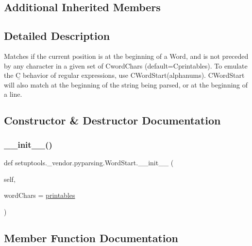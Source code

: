 \subsection*{Additional Inherited Members}


\subsection{Detailed Description}
\begin{DoxyVerb}Matches if the current position is at the beginning of a Word, and
is not preceded by any character in a given set of C{wordChars}
(default=C{printables}). To emulate the C{\b} behavior of regular expressions,
use C{WordStart(alphanums)}. C{WordStart} will also match at the beginning of
the string being parsed, or at the beginning of a line.
\end{DoxyVerb}
 

\subsection{Constructor \& Destructor Documentation}
\mbox{\label{classsetuptools_1_1__vendor_1_1pyparsing_1_1WordStart_a0a024c22e76cec265febde6079752d71}} 
\subsubsection{\texorpdfstring{\+\_\+\+\_\+init\+\_\+\+\_\+()}{\_\_init\_\_()}}
{\footnotesize\ttfamily def setuptools.\+\_\+vendor.\+pyparsing.\+Word\+Start.\+\_\+\+\_\+init\+\_\+\+\_\+ (\begin{DoxyParamCaption}\item[{}]{self,  }\item[{}]{word\+Chars = {\ttfamily \hyperlink{namespacesetuptools_1_1__vendor_1_1pyparsing_a0a5e033cd7141a5a856b879c7b6e730f}{printables}} }\end{DoxyParamCaption})}



\subsection{Member Function Documentation}
\mbox{\label{classsetuptools_1_1__vendor_1_1pyparsing_1_1WordStart_a2d8d791c73a75427d597bdc7a7de8e0c}} 
